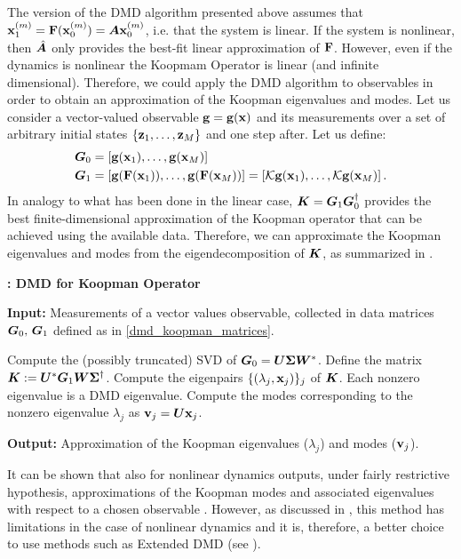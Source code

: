 The version of the DMD algorithm presented above assumes that $\vb{x}_1^{(m)} = \vb{F}(\vb{x}_0^{(m)}) =  \vb*{A}\vb{x}_0^{(m)}$, i.e. that the system is linear. If the system is nonlinear, then $\hat{\vb*{A}}$ only provides the best-fit linear approximation of $\vb{F}$. However, even if the dynamics is nonlinear the Koopmam Operator is linear (and infinite dimensional). Therefore, we could apply the DMD algorithm to observables in order to obtain an approximation of the Koopman eigenvalues and modes. Let us consider a vector-valued observable $\vb{g} = \vb{g}(\vb{x})$ and its measurements over a set of arbitrary initial states $\{\vb{z}_1,\dots, \vb{z}_M\}$ and one step after. Let us define:
\begin{equation}
    \label{dmd_koopman_matrices}
    \begin{split}
        \vb*{G}_0 &= \left[\vb{g}(\vb{x}_1), \dots, \vb{g}(\vb{x}_M)\right] \\
        \vb*{G}_1 &= \left[\vb{g}(\vb{F}(\vb{x}_1)), \dots, \vb{g}(\vb{F}(\vb{x}_M))\right] = \left[\mathcal{K}\vb{g}(\vb{x}_1), \dots, \mathcal{K}\vb{g}(\vb{x}_M)\right].\\
    \end{split}
\end{equation}
In analogy to what has been done in the linear case, $\vb*{K} = \vb*{G}_1\vb*{G}_0^{\dagger}$ provides the best finite-dimensional approximation of the Koopman operator that can be achieved using the available data. Therefore, we can approximate the Koopman eigenvalues and modes from the eigendecomposition of $\vb*{K}$, as summarized in .

\begin{algorithm}[h]
\caption{\textbf{: DMD for Koopman Operator}}
\label{alg_koopman_dmd}
\textbf{Input:} Measurements of a vector values observable, collected in data matrices $\vb*{G}_0,\,\vb*{G}_1$ defined as in \eqref{dmd_koopman_matrices}.
\begin{algorithmic}[1]
\State Compute the (possibly truncated) SVD of $\vb*{G}_0 = \vb*{U}\vb*{\Sigma}\vb*{W}^*$.
\State Define the matrix $\vb*{K} := \vb*{U}^*\vb*{G}_1\vb*{W}\vb*{\Sigma}^{\dagger}$.
\State Compute the eigenpairs $\{(\lambda_j, \vb{x}_j)\}_j$ of $\vb*{K}$. Each nonzero eigenvalue is a DMD eigenvalue.
\State Compute the modes corresponding to the nonzero eigenvalue $\lambda_j$ as $\vb{v}_j = \vb*{U}\vb{x}_j$. 
\end{algorithmic}
\textbf{Output:} Approximation of the Koopman eigenvalues ($\lambda_j$) and modes ($\vb{v}_j$).
\end{algorithm}

It can be shown that also for nonlinear dynamics  outputs, under fairly restrictive hypothesis, approximations of the Koopman modes and associated eigenvalues with respect to a chosen observable \cite{rowley_spectral_2009, tu_dynamic_2014}. However, as discussed in \cite{tu_dynamic_2014}, this method has limitations in the case of nonlinear dynamics and it is, therefore, a better choice to use methods such as Extended DMD \cite{williams_data-driven_2015} (see ).
